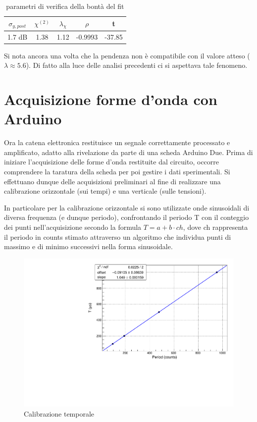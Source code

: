 \documentclass{article}
\begin{document}
\begin{table}[ht]
    \centering
    \begin{tabular}{ccccc}
        \toprule
        $\sigma_{y, post}$    &$\chi^{(2)}$    &$\lambda_{\chi}$   &$\rho$  &t   \\
        \midrule
        1.7 dB                &1.38           &1.12              &-0.9993&-37.85\\
        \bottomrule
    \end{tabular}
    \caption{parametri di verifica della bontà del fit}
\end{table}

Si nota ancora una volta che la pendenza non è compatibile con il valore atteso ($\lambda \approx 5.6$).
Di fatto alla luce delle analisi precedenti ci si aspettava tale fenomeno.

\section{Acquisizione forme d'onda con Arduino}

Ora la catena elettronica restituisce un segnale correttamente processato e amplificato, adatto alla rivelazione da parte di una scheda Arduino Due. Prima di iniziare
l'acquisizione delle forme d'onda restituite dal circuito, occorre comprendere la taratura della scheda per poi gestire i dati sperimentali. Si effettuano dunque delle 
acquisizioni preliminari al fine di realizzare una calibrazione orizzontale (sui tempi) e una verticale (sulle tensioni).

In particolare per la calibrazione orizzontale si sono utilizzate onde sinusoidali di diversa frequenza (e dunque periodo), confrontando
il periodo T con il conteggio dei punti nell'acquisizione secondo la formula $T = a + b \cdot ch$, dove ch rappresenta il periodo in 
counts stimato attraverso un algoritmo che individua punti di massimo e di minimo successivi nella forma sinusoidale.

\begin{center}
\begin{figure}[H]
\centering
\includegraphics[scale=0.4, angle=0]{calibtempi.pdf}
\caption{Calibrazione temporale}
\label{fig:calibtempi}
\end{figure}
\end{center}
\end{document}
